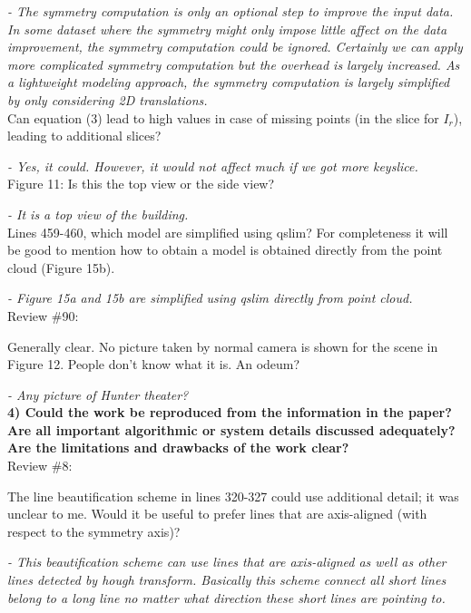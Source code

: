 \documentclass[12pt,letterpaper]{article}
\begin{document}
{\it - The symmetry computation is only an optional step to improve the input data. In some dataset where
the symmetry might only impose little affect on the data improvement, the symmetry computation could
be ignored.
Certainly we can apply more complicated symmetry computation but the overhead is largely increased.
As a lightweight modeling approach, the symmetry computation is largely simplified by only
considering 2D translations. }\\



 Can equation (3) lead to high values in case of missing points (in the slice for $I_r$),
leading to additional slices? 

{\it - Yes, it could. However, it would not affect much if we got more keyslice.}\\


 Figure 11: Is this the top view or the side view? 

{\it - It is a top view of the building. }\\


Lines 459-460, which model are simplified using qslim? For completeness it will be
good to mention how to obtain a model is obtained directly from the point cloud
(Figure 15b). 

{\it - Figure 15a and 15b are simplified using qslim directly from point cloud.}\\


Review \#90:


 Generally clear. No picture taken by normal camera is shown for the scene in Figure
12. People don't know what it is. An odeum? 

{\it - Any picture of Hunter theater? }\\



\textbf{ 4) Could the work be reproduced from the information in the paper? Are all important algorithmic or system details discussed adequately? Are the
limitations and drawbacks of the work clear? }\\

Review \#8:

 The line beautification scheme in lines 320-327 could use additional detail; it was
unclear to me.
Would it be useful to prefer lines that are axis-aligned (with respect to the symmetry
axis)? 

{\it - This beautification scheme can use lines that are axis-aligned as well as other lines detected
by hough transform. Basically this scheme connect all short lines belong to a long line no matter 
what direction these short lines are pointing to.}\\
\end{document}
